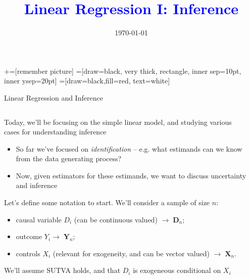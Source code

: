 \documentclass[notes,11pt, aspectratio=169]{beamer}
\title[]{\textcolor{blue}{Linear Regression I: Inference}}
\author[PGP]{}
\institute[FRBNY]{\small{Paul Goldsmith-Pinkham}}
\date{\today}
\newenvironment{wideitemize}{\itemize\addtolength{\itemsep}{10pt}}{\enditemize}
\begin{document}
\newcommand\marktopleft[1]{%
    \tikz[overlay,remember picture] 
        \node (marker-#1-a) at (-.3em,.3em) {};%
}
\newcommand\markbottomright[2]{%
    \tikz[overlay,remember picture] 
        \node (marker-#1-b) at (0em,0em) {};%
}
+=[remember picture] 
 =[draw=black, very thick, rectangle, inner sep=10pt, inner ysep=20pt]
 =[draw=black,fill=red, text=white]

\begin{frame}
\maketitle

\end{frame}

\begin{frame}{Linear Regression and Inference}
\begin{columns}[T] %
\begin{column}{.8\textwidth}
  \begin{wideitemize}
  \item Today, we'll be focusing on the simple linear model, and studying various cases for understanding inference
    \begin{itemize}
    \item So far we've focused on \emph{identification} -- e.g. what estimands can we know from the data generating process?
    \item Now, given estimators for these estimands, we want to discuss uncertainty and inference
    \end{itemize}
  \item Let's define some notation to start. We'll consider a sample of size $n$:
    \begin{itemize}
    \item causal variable $D_{i}$ (can be continuous valued) $\rightarrow  \; \mathbf{D}_{n}$;
    \item outcome $Y_{i} \rightarrow  \; \mathbf{Y}_{n}$;
    \item controls $X_{i}$ (relevant for exogeneity, and can be vector valued)  $\rightarrow  \; \mathbf{X}_{n}$.
    \end{itemize}
  \item We'll assume SUTVA holds, and that $D_{i}$ is exogeneous
    conditional on $X_{i}$
  \end{wideitemize}
  \end{column}%
  \hfill%
  \begin{column}{.5\textwidth}
  \end{column}
\end{columns}
\end{frame}
\end{document}
